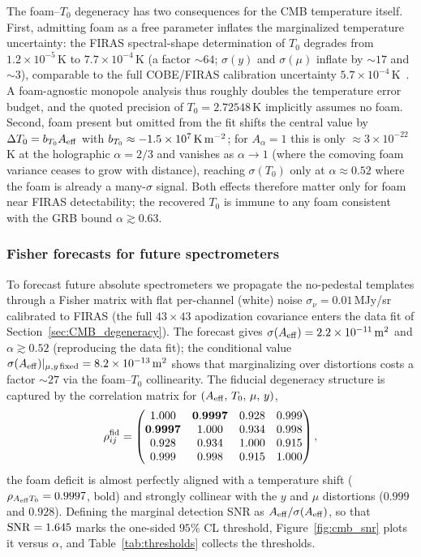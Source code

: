 \documentclass[aps,prd,onecolumn,amsmath,amssymb]{revtex4-2}
\begin{document}
The foam--$T_0$ degeneracy has two consequences for the CMB
temperature itself.  First, admitting foam as a free parameter inflates the
marginalized temperature uncertainty: the FIRAS spectral-shape
determination of $T_0$ degrades from $1.2\times10^{-5}$\,K to
$7.7\times10^{-4}$\,K (a factor $\sim 64$; $\sigma(y)$ and
$\sigma(\mu)$ inflate by $\sim 17$ and $\sim 3$), comparable
to the full COBE/FIRAS calibration uncertainty
$5.7\times10^{-4}$\,K~\cite{Fixsen2009}.  A foam-agnostic monopole
analysis thus roughly doubles the temperature error budget, and the quoted
precision of $T_0=2.72548$\,K implicitly assumes no foam.  Second, foam
present but omitted from the fit shifts the central value by
$\Delta T_0 = b_{T_0}A_{\rm eff}$ with
$b_{T_0}\approx -1.5\times10^7\,{\rm K\,m^{-2}}$; for $A_\alpha=1$ this
is only $\approx 3\times10^{-22}$\,K at the holographic $\alpha=2/3$ and
vanishes as $\alpha\to1$ (where the comoving foam variance ceases to grow
with distance), reaching $\sigma(T_0)$ only
at $\alpha\approx 0.52$ where the foam is already a many-$\sigma$
signal.  Both effects therefore matter only for foam near FIRAS
detectability; the recovered $T_0$ is immune to any foam consistent
with the GRB bound $\alpha\gtrsim 0.63$.

\subsubsection{Fisher forecasts for future spectrometers}
\label{sec:CMB_forecast}

To forecast future absolute spectrometers we propagate the no-pedestal
templates through a Fisher matrix with flat per-channel (white) noise
$\sigma_\nu=0.01$\,MJy/sr calibrated to FIRAS (the full $43\times43$
apodization covariance enters the data fit of
Section~\ref{sec:CMB_degeneracy}).  The forecast gives
$\sigma(A_{\rm eff})=2.2\times10^{-11}\,{\rm m}^2$ and
$\alpha\gtrsim 0.52$ (reproducing the data fit); the conditional value
$\sigma(A_{\rm eff})|_{\mu,y\,\text{fixed}}=8.2\times10^{-13}\,{\rm
m}^2$ shows that marginalizing over distortions costs a factor
$\sim 27$ via the foam--$T_0$ collinearity.  The fiducial
degeneracy structure is captured by the correlation matrix for
$(A_{\rm eff},\,T_0,\,\mu,\,y)$,
\begin{equation}
\rho^{\rm fid}_{ij} = \begin{pmatrix}
  1.000 & \mathbf{0.9997} & 0.928 & 0.999 \\
  \mathbf{0.9997} & 1.000 & 0.934 & 0.998 \\
  0.928 & 0.934 & 1.000 & 0.915 \\
  0.999 & 0.998 & 0.915 & 1.000
\end{pmatrix},
\label{eq:fisher_corr_matrix_fid}
\end{equation}
the foam deficit is almost perfectly aligned with a
temperature shift ($\rho_{A_{\rm eff}T_0}=0.9997$, bold) and strongly
collinear with the $y$ and $\mu$ distortions ($0.999$ and $0.928$).
Defining the marginal detection SNR as $A_{\rm eff}/\sigma(A_{\rm
eff})$, so that ${\rm SNR}=1.645$ marks the one-sided $95\%$ CL threshold,
Figure~\ref{fig:cmb_snr} plots it versus $\alpha$, and
Table~\ref{tab:thresholds} collects the thresholds.
\end{document}
